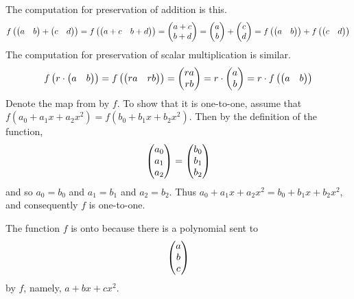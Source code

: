 \begin{exercises}
\begin{answer}
\begin{exparts}
       The computation for preservation of addition is this.
       \begin{equation*}
         f\left(\begin{pmatrix} a &b \end{pmatrix}+\begin{pmatrix} c &d \end{pmatrix}\right) 
           = f\left(\begin{pmatrix} a+c &b+d \end{pmatrix}\right)           
           = \begin{pmatrix} a+c \\ b+d \end{pmatrix}           
           = \begin{pmatrix} a \\ b \end{pmatrix}+\begin{pmatrix} c \\ d \end{pmatrix}         
           = f\left(\begin{pmatrix} a &b \end{pmatrix}\right)+f\left(\begin{pmatrix} c &d \end{pmatrix}\right)
       \end{equation*}
       The computation for preservation of scalar multiplication is similar.
       \begin{equation*}
         f\left(r\cdot\begin{pmatrix} a &b \end{pmatrix}\right) 
           = f\left(\begin{pmatrix} ra &rb \end{pmatrix}\right)          
           = \begin{pmatrix} ra \\ rb \end{pmatrix}          
           = r\cdot\begin{pmatrix} a \\ b \end{pmatrix}          
           = r\cdot f\left(\begin{pmatrix} a &b \end{pmatrix}\right)
       \end{equation*}
     \partsitem Denote the map from  by
      $f$. 
      To show that it is one-to-one,
      assume that \( f(a_0+a_1x+a_2x^2)=f(b_0+b_1x+b_2x^2) \).
      Then by the definition of the function, 
      \begin{equation*}
        \begin{pmatrix} a_0 \\ a_1 \\ a_2 \end{pmatrix}
        =\begin{pmatrix} b_0 \\ b_1 \\ b_2 \end{pmatrix}
      \end{equation*}
      and so \( a_0=b_0 \) and \( a_1=b_1 \) and \( a_2=b_2 \).
      Thus \( a_0+a_1x+a_2x^2=b_0+b_1x+b_2x^2 \), and consequently \( f \)
      is one-to-one.

      The function $f$ is onto because there is a polynomial sent to
      \begin{equation*}
        \begin{pmatrix} a \\ b \\ c \end{pmatrix}
      \end{equation*}
      by \( f \), namely, \( a+bx+cx^2 \).


\end{exparts}
\end{answer}
\end{exercises}
